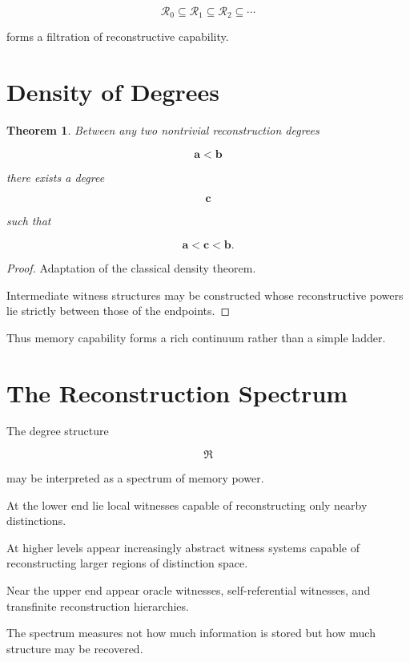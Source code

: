 \documentclass[12pt,oneside]{book}
\theoremstyle{plain} \newtheorem{theorem}{Theorem}[chapter] \newtheorem{lemma}[theorem]{Lemma} \newtheorem{proposition}[theorem]{Proposition} \newtheorem{corollary}[theorem]{Corollary}
\theoremstyle{definition} \newtheorem{definition}[theorem]{Definition} \newtheorem{axiom}[theorem]{Axiom} \newtheorem{construction}[theorem]{Construction}
\theoremstyle{remark} \newtheorem{remark}[theorem]{Remark} \newtheorem{example}[theorem]{Example}
\begin{document}
\[
\mathcal R_0
\subseteq
\mathcal R_1
\subseteq
\mathcal R_2
\subseteq
\cdots
\]

forms a filtration of reconstructive capability.

\section{Density of Degrees}

\begin{theorem}

Between any two nontrivial reconstruction degrees

\[
\mathbf a
<
\mathbf b
\]

there exists a degree

\[
\mathbf c
\]

such that

\[
\mathbf a
<
\mathbf c
<
\mathbf b.
\]

\end{theorem}

\begin{proof}

Adaptation of the classical density theorem.

Intermediate witness structures may be constructed whose reconstructive powers lie strictly between those of the endpoints.

\end{proof}

Thus memory capability forms a rich continuum rather than a simple ladder.

\section{The Reconstruction Spectrum}

The degree structure

\[
\mathfrak R
\]

may be interpreted as a spectrum of memory power.

At the lower end lie local witnesses capable of reconstructing only nearby distinctions.

At higher levels appear increasingly abstract witness systems capable of reconstructing larger regions of distinction space.

Near the upper end appear oracle witnesses, self-referential witnesses, and transfinite reconstruction hierarchies.

The spectrum measures not how much information is stored but how much structure may be recovered.
\end{document}
